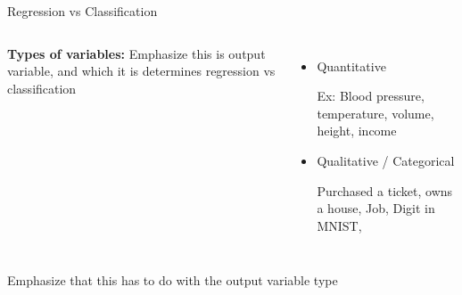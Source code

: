 \documentclass[aspectratio=169,usenames,dvipsnames]{beamer}
\newcommand{\InstructorNotes}[1]{{\color{orange}#1}}
\begin{document}
\begin{frame}[c]{Regression vs Classification}


\begin{columns}
\textbf{Types of variables:} \InstructorNotes{Emphasize this is output variable, and which it is determines regression vs classification}

\begin{itemize}
	\item Quantitative

\InstructorNotes{Ex: Blood pressure, temperature, volume, height, income}
	\vspace{1in}

	\item Qualitative / Categorical

\InstructorNotes{Purchased a ticket, owns a house, Job, Digit in MNIST, }

	\vspace{ 1in}
\end{itemize}

\end{columns}

\InstructorNotes{Emphasize that this has to do with the output variable type}

\end{frame}
\end{document}
